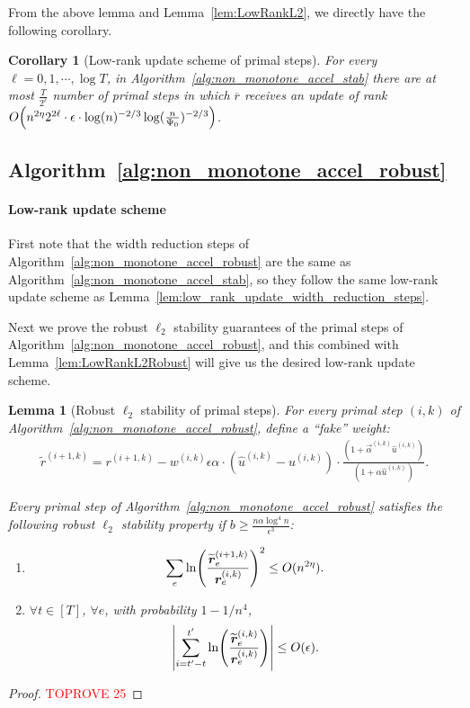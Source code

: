 \documentclass[11pt]{article}
\newtheorem{lemma}[theorem]{Lemma}
\newtheorem{corollary}[theorem]{Corollary}
\let\originalleft\left
\let\originalright\right
\renewcommand{\left}{\mathopen{}\mathclose\bgroup\originalleft}
\renewcommand{\right}{\aftergroup\egroup\originalright}
\newcommand\rr{\boldsymbol{\mathit{r}}}
\newcommand\uu{\boldsymbol{\mathit{u}}}
\newcommand\ww{\boldsymbol{\mathit{w}}}
\newcommand{\wh}{\widehat}
\newcommand{\wt}{\widetilde}
\newcommand{\ov}{\overline}
\begin{document}
From the above lemma and Lemma~\ref{lem:LowRankL2}, we directly have the following corollary.
\begin{corollary}[Low-rank update scheme of primal steps]
For every $\ell = 0,1, \cdots, \log T$, in Algorithm~\ref{alg:non_monotone_accel_stab} there are at most $\frac{T}{2^{\ell}}$ number of primal steps in which $\ov{\rr}$ receives an update of rank $O\left(n^{2\eta} 2^{2\ell}\cdot \epsilon \cdot \log(n)^{-2/3} \log(\frac{n}{\Psi_0})^{-2/3} \right)$. 
\end{corollary}

\subsection{Algorithm~\ref{alg:non_monotone_accel_robust}}\label{sec:stability_algo_2}

\paragraph{Low-rank update scheme}
First note that the width reduction steps of Algorithm~\ref{alg:non_monotone_accel_robust} are the same as Algorithm~\ref{alg:non_monotone_accel_stab}, so they follow the same low-rank update scheme as Lemma~\ref{lem:low_rank_update_width_reduction_steps}.

Next we prove the robust $\ell_2$ stability guarantees of the primal steps of Algorithm~\ref{alg:non_monotone_accel_robust}, and this combined with Lemma~\ref{lem:LowRankL2Robust} will give us the desired low-rank update scheme. 

\begin{lemma}[Robust $\ell_2$ stability of primal steps]
For every primal step $(i,k)$ of Algorithm~\ref{alg:non_monotone_accel_robust}, define a ``fake'' weight:
\begin{align}\label{eq:def_tilde_r}
\wt{\rr}^{(i+1,k)} = \rr^{(i+1,k)} - \ww^{(i,k)} \epsilon \alpha \cdot ( \wh{\uu}^{(i,k)} - \uu^{(i,k)}) \cdot \frac{(1 + \overrightarrow{\alpha}^{(i,k)} \wh{\uu}^{(i,k)})}{(1 + \alpha \wh{\uu}^{(i,k)})}.
\end{align}

Every primal step of Algorithm~\ref{alg:non_monotone_accel_robust} satisfies the following robust $\ell_2$ stability property if $b \geq \frac{n \alpha \log^4 n}{\epsilon^3}$: 
\begin{enumerate}
    \item 
    \[
    \sum_e \ln\left(\frac{\wt{\rr}_e^{(i+1,k)}}{\rr_e^{(i,k)}}\right)^2 \leq O(n^{2\eta}). 
    \]
    \item $\forall t \in [T]$, $\forall e$, with probability $1 - 1/n^4$,
    \[
    \left|\sum_{i = t'-t}^{t'} \ln\left(\frac{\wt{\rr}_e^{(i,k)}}{\rr_e^{(i,k)}}\right)\right| \leq O(\epsilon). 
    \]
\end{enumerate}
\end{lemma}
\begin{proof}\textcolor{red}{TOPROVE 25}\end{proof}
\end{document}
